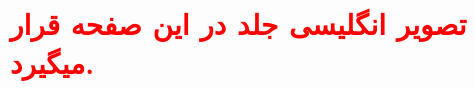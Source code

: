 \BNazF
\section*{\textcolor{red}{\textbf{تصویر انگلیسی جلد در این صفحه قرار میگیرد.}}}
\thispagestyle{empty}
